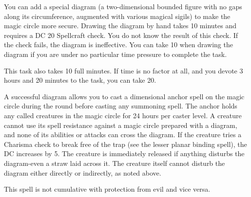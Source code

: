 {You can add a special diagram (a two-dimensional bounded figure with no gaps along its circumference, augmented with various magical sigils) to make the magic circle more secure. Drawing the diagram by hand takes 10 minutes and requires a DC 20 Spellcraft check. You do not know the result of this check. If the check fails, the diagram is ineffective. You can take 10 when drawing the diagram if you are under no particular time pressure to complete the task.

This task also takes 10 full minutes. If time is no factor at all, and you devote 3 hours and 20 minutes to the task, you can take 20.

A successful diagram allows you to cast a dimensional anchor spell on the magic circle during the round before casting any summoning spell. The anchor holds any called creatures in the magic circle for 24 hours per caster level. A creature cannot use its spell resistance against a magic circle prepared with a diagram, and none of its abilities or attacks can cross the diagram. If the creature tries a Charisma check to break free of the trap (see the lesser planar binding spell), the DC increases by 5. The creature is immediately released if anything disturbs the diagram-even a straw laid across it. The creature itself cannot disturb the diagram either directly or indirectly, as noted above.

This spell is not cumulative with protection from evil and vice versa.}
        
